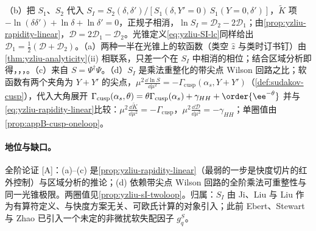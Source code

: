 \begin{proofsketch}
（b）把 $S_1$、$S_2$ 代入 $S_I=S_2(\delta,\delta')/[S_1(\delta,Y'=0)\,S_1(Y=0,\delta')]$\cite[式~(19)]{Ji:2019sxk}，$\tilde K$ 项 $-\ln(\delta\delta')+\ln\delta+\ln\delta'=0$，正规子相消，$\ln S_I=\mathcal D_2-2\mathcal D_1$；由\cref{prop:yzliu-rapidity-linear}，$\mathcal D=2\mathcal D_1-\mathcal D_2$。光锥定义\cref{eq:yzliu-SI-lc}同样给出 $\mathcal D_1=\frac12(\mathcal D+\mathcal D_2)$。（a）两种一半在光锥上的软函数（类空 $\hat z$ 与类时订书钉）由\cref{thm:yzliu-analyticity}(ii) 相联系，只差一个在 $S_I$ 中相消的相位；结合区域分析即得\cite[式~(19)--(21)]{Ji:2019sxk}，\cite[式~(18)--(21)]{Ji:2019ewn}，\cite[式~(76)--(81)、(120)--(122)]{Liu:2022nnk}，\cite[式~(46)--(48)]{Ji:2021znw}。（c）来自 $S=\Psi^\dagger\Psi$。（d）$S_I$ 是乘法重整化的带尖点 Wilson 回路之比；软函数有两个夹角为 $Y+Y'$ 的尖点，$\mu^2\frac{\dd\ln S}{\dd\mu^2}=-\Gamma_{\mathrm{cusp}}(\alpha_s,Y+Y')$（\cref{def:sudakov-cusp}），代入大角展开 $\Gamma_{\mathrm{cusp}}(\alpha_s,\theta)=\theta\Gamma_{\mathrm{cusp}}(\alpha_s)+\gamma_{HH}+\order{\ee^{-\theta}}$ 并与\cref{eq:yzliu-rapidity-linear}比较：$\mu^2\frac{\dd\tilde K}{\dd\mu^2}=-\Gamma_{\mathrm{cusp}}$，$\mu^2\frac{\dd\mathcal D}{\dd\mu^2}=-\gamma_{HH}$；单圈值由\cref{prop:appB-cusp-oneloop}。
\end{proofsketch}

\paragraph{地位与缺口。}全阶论证 [A]：(a)--(c) 是\cref{prop:yzliu-rapidity-linear}（最弱的一步是快度切片的红外控制）与区域分析的推论；(d) 依赖带尖点 Wilson 回路的全阶乘法可重整性与同一光锥极限。两圈值见\cref{prop:yzliu-sI-twoloop}。归属：$S_I$ 由 Ji、Liu 与 Liu 作为有算符定义、与快度方案无关、可欧氏计算的对象引入\cite{Ji:2019sxk,Ji:2019ewn}；此前 Ebert、Stewart 与 Zhao 已引入一个未定的非微扰软失配因子 $g^S_q$\cite{EbertStewartZhao2019}。

